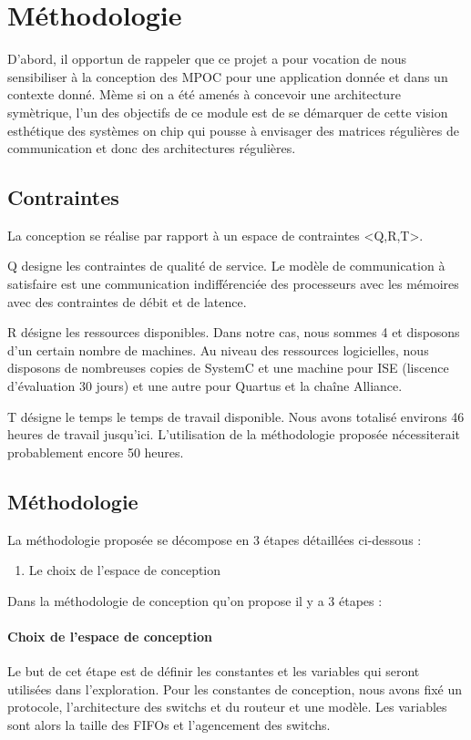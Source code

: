 \documentclass[11pt]{article}
\begin{document}
\section{Méthodologie}

D'abord, il opportun de rappeler que ce projet a pour vocation de nous sensibiliser à la conception des MPOC pour une application donnée et dans un contexte donné. Mème si on a été amenés à concevoir une architecture symètrique, l'un des objectifs de ce module est de se démarquer de cette vision esthétique des systèmes on chip qui pousse à envisager des matrices régulières de communication et donc des architectures régulières.  

\subsection{Contraintes}

La conception se réalise par rapport à un espace de contraintes <Q,R,T>. 

Q designe les contraintes de qualité de service. Le modèle de communication à satisfaire est une communication indifférenciée des processeurs avec les mémoires avec des contraintes de débit et de latence.

R désigne les ressources disponibles. Dans notre cas, nous sommes 4 et disposons d'un certain nombre de machines. Au niveau des ressources logicielles, nous disposons de nombreuses copies de SystemC et une machine pour ISE (liscence d'évaluation 30 jours) et une autre pour Quartus et la chaîne Alliance.

T désigne le temps le temps de travail disponible. Nous avons totalisé environs 46 heures de travail jusqu'ici. L'utilisation de la méthodologie proposée nécessiterait probablement encore 50 heures.

\subsection{Méthodologie}

La méthodologie proposée se décompose en 3 étapes détaillées ci-dessous :
\begin{enumerate}
\item Le choix de l'espace de conception
\end{enumerate}

Dans la méthodologie de conception qu'on propose il y a 3 étapes : 
\paragraph{Choix de l'espace de conception}
Le but de cet étape est de définir les constantes et les variables qui seront utilisées dans l'exploration. Pour les constantes de conception, nous avons fixé un protocole, l'architecture des switchs et du routeur et une modèle. Les variables sont alors la taille des FIFOs et l'agencement des switchs.
\end{document}
